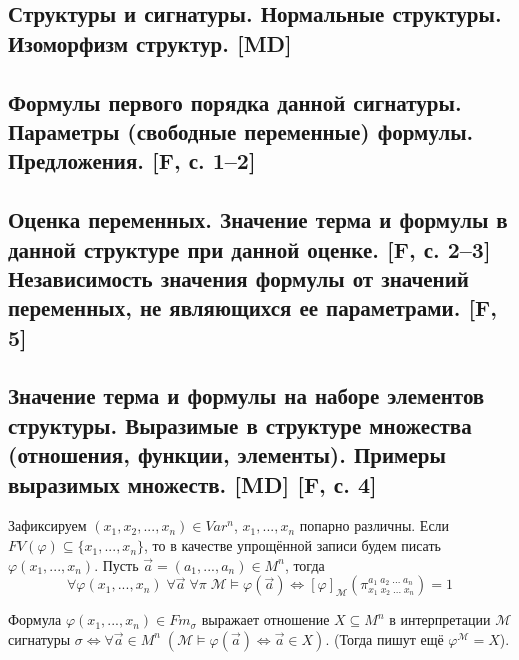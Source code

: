 \documentclass[a4paper, fleqn]{article}
\begin{document}
    \subsection{Структуры и сигнатуры. Нормальные структуры. Изоморфизм структур. [MD]}

    \subsection{Формулы первого порядка данной сигнатуры. Параметры (свободные переменные) формулы. Предложения. [F, с. 1–2]}

    \subsection{Оценка переменных. Значение терма и формулы в данной структуре при данной оценке. [F, с. 2–3] Независимость значения формулы от значений переменных, не являющихся ее параметрами. [F, 5]}

    \subsection{Значение терма и формулы на наборе элементов структуры. Выразимые в структуре множества (отношения, функции, элементы). Примеры выразимых множеств. [MD] [F, с. 4]}
    \begin{proposition}
        Зафиксируем $(x_1, x_2, ..., x_n) \in Var^n$, $x_1, ..., x_n$ попарно различны. Если $FV(\varphi) \subseteq \{x_1, ..., x_n\}$, то в качестве упрощённой записи будем писать $\varphi(x_1, ..., x_n)$. Пусть $\overrightarrow{a} = (a_1, ..., a_n) \in M^n$, тогда
        \[\forall \varphi(x_1, ..., x_n) \; \forall \overrightarrow{a} \; \forall \mathcal{\pi} \; \mathcal{M} \vDash \varphi(\overrightarrow{a}) \Leftrightarrow [\varphi]_{\mathcal{M}} (\pi_{x_1 \; x_2 \; ... \; x_n}^{a_1 \; a_2 \; ... \; a_n}) = 1\]
    \end{proposition}

    \begin{definition}
        Формула $\varphi(x_1, ..., x_n) \in Fm_{\sigma}$ выражает отношение $X \subseteq M^n$ в интерпретации $\mathcal{M}$ сигнатуры $\sigma \Leftrightarrow \forall \overrightarrow{a} \in M^n \; (\mathcal{M} \vDash \varphi(\overrightarrow{a}) \Leftrightarrow \overrightarrow{a} \in X)$. (Тогда пишут ещё $\varphi^{\mathcal{M}} = X$).
    \end{definition}
\end{document}
